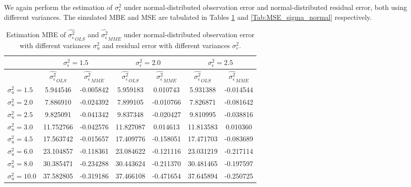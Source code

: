 \documentclass{article}
\begin{document}
We again perform the estimation of $\sigma^2_\epsilon$ under normal-distributed observation error and normal-distributed residual error, both using different variances.
The simulated MBE and MSE are tabulated in Tables \ref{Tab:MBE_sigma_normal} and \ref{Tab:MSE_sigma_normal} respectively.

\begin{table}[ht]
    \centering
    \caption{Estimation MBE of $\hat{\sigma^2_\epsilon}_{OLS}$ and $\hat{\sigma^2_\epsilon}_{MME}$ under normal-distributed observation error with different variances $\sigma^2_u$ and residual error with different variances $\sigma^2_\epsilon$.}
    \label{Tab:MBE_sigma_normal}
    \begin{tabular}[t]{lcccccc}
        \hline
        &\multicolumn{2}{c}{$\sigma^2_\epsilon=1.5$}&\multicolumn{2}{c}{$\sigma^2_\epsilon=2.0$}&\multicolumn{2}{c}{$\sigma^2_\epsilon=2.5$}\\
        \hline
        &$\hat{\sigma^2_\epsilon}_{OLS}$&$\hat{\sigma^2_\epsilon}_{MME}$&$\hat{\sigma^2_\epsilon}_{OLS}$&
        $\hat{\sigma^2_\epsilon}_{MME}$&$\hat{\sigma^2_\epsilon}_{OLS}$&$\hat{\sigma^2_\epsilon}_{MME}$\\
        \hline
        $\sigma^2_u = 1.5$&5.944546&-0.005842&5.959183&0.010743&5.931388&-0.014544\\
        $\sigma^2_u = 2.0$&7.886910&-0.024392&7.899105&-0.010766&7.826871&-0.081642\\
        $\sigma^2_u = 2.5$&9.825091&-0.041342&9.837348&-0.020427&9.810995&-0.038816\\
        $\sigma^2_u = 3.0$&11.752766&-0.042576&11.827087&0.014613&11.813583&0.010360\\
        $\sigma^2_u = 4.5$&17.563742&-0.015657&17.409776&-0.158051&17.471703&-0.083689\\
        $\sigma^2_u = 6.0$&23.104857&-0.118361&23.084622&-0.121116&23.031219&-0.217114\\
        $\sigma^2_u = 8.0$&30.385471&-0.234288&30.443624&-0.211370&30.481465&-0.197597\\
        $\sigma^2_u = 10.0$&37.582805&-0.319186&37.466108&-0.471654&37.645894&-0.250725\\
        \hline
    \end{tabular}
\end{table}
\end{document}
